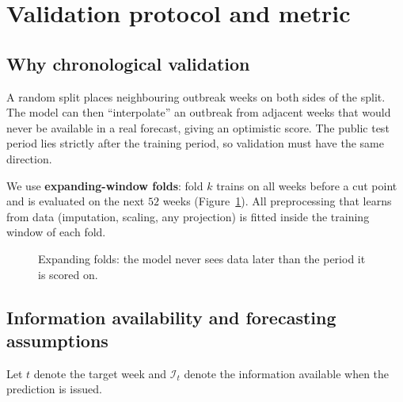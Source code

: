 \documentclass[11pt,a4paper]{article}
\newcommand{\key}[1]{\textbf{\color{teal}#1}}
\begin{document}
\section{Validation protocol and metric}
\subsection{Why chronological validation}
A random split places neighbouring outbreak weeks on both sides of the split. The model can then ``interpolate'' an outbreak from adjacent weeks that would never be available in a real forecast, giving an optimistic score. The public test period lies strictly after the training period, so validation must have the same direction.

We use \key{expanding-window folds}: fold $k$ trains on all weeks before a cut point and is evaluated on the next $52$ weeks (Figure~\ref{fig:cv}). All preprocessing that learns from data (imputation, scaling, any projection) is fitted inside the training window of each fold.

\begin{figure}[H]
\centering
{}
\caption{Expanding folds: the model never sees data later than the period it is scored on.}
\label{fig:cv}
\end{figure}

\subsection{Information availability and forecasting assumptions}

Let $t$ denote the target week and
$\mathcal{I}_t$ denote the information
available when the prediction is issued.
\end{document}
